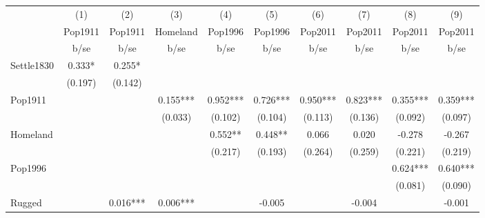 {
\def\sym#1{\ifmmode^{#1}\else\(^{#1}\)\fi}
\begin{tabular}{l*{9}{c}}
\hline\hline
                    &\multicolumn{1}{c}{(1)}&\multicolumn{1}{c}{(2)}&\multicolumn{1}{c}{(3)}&\multicolumn{1}{c}{(4)}&\multicolumn{1}{c}{(5)}&\multicolumn{1}{c}{(6)}&\multicolumn{1}{c}{(7)}&\multicolumn{1}{c}{(8)}&\multicolumn{1}{c}{(9)}\\
                    &\multicolumn{1}{c}{Pop1911}&\multicolumn{1}{c}{Pop1911}&\multicolumn{1}{c}{Homeland}&\multicolumn{1}{c}{Pop1996}&\multicolumn{1}{c}{Pop1996}&\multicolumn{1}{c}{Pop2011}&\multicolumn{1}{c}{Pop2011}&\multicolumn{1}{c}{Pop2011}&\multicolumn{1}{c}{Pop2011}\\
                    &        b/se   &        b/se   &        b/se   &        b/se   &        b/se   &        b/se   &        b/se   &        b/se   &        b/se   \\
\hline
Settle1830          &       0.333*  &       0.255*  &               &               &               &               &               &               &               \\
                    &     (0.197)   &     (0.142)   &               &               &               &               &               &               &               \\
Pop1911             &               &               &       0.155***&       0.952***&       0.726***&       0.950***&       0.823***&       0.355***&       0.359***\\
                    &               &               &     (0.033)   &     (0.102)   &     (0.104)   &     (0.113)   &     (0.136)   &     (0.092)   &     (0.097)   \\
Homeland            &               &               &               &       0.552** &       0.448** &       0.066   &       0.020   &      -0.278   &      -0.267   \\
                    &               &               &               &     (0.217)   &     (0.193)   &     (0.264)   &     (0.259)   &     (0.221)   &     (0.219)   \\
Pop1996             &               &               &               &               &               &               &               &       0.624***&       0.640***\\
                    &               &               &               &               &               &               &               &     (0.081)   &     (0.090)   \\
Rugged              &               &       0.016***&       0.006***&               &      -0.005   &               &      -0.004   &               &      -0.001   \\

\end{tabular}}
